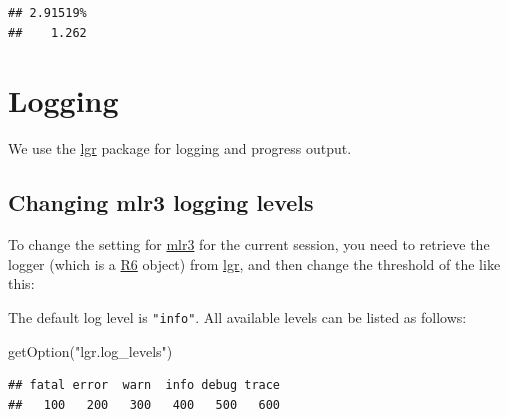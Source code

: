 \documentclass[
]{scrbook}
\newenvironment{Shaded}{\begin{snugshade}}{\end{snugshade}}
\newcommand{\FunctionTok}[1]{\textcolor[rgb]{0.00,0.00,0.00}{#1}}
\newcommand{\NormalTok}[1]{#1}
\newcommand{\OtherTok}[1]{\textcolor[rgb]{0.56,0.35,0.01}{#1}}
\newcommand{\SpecialCharTok}[1]{\textcolor[rgb]{0.00,0.00,0.00}{#1}}
\newcommand{\StringTok}[1]{\textcolor[rgb]{0.31,0.60,0.02}{#1}}
\renewenvironment{Shaded} {\begin{snugshade}\small} {\end{snugshade}}
\begin{document}
\begin{verbatim}
## 2.91519% 
##    1.262
\end{verbatim}

\hypertarget{logging}{%
\section{Logging}\label{logging}}

We use the \href{https://cran.r-project.org/package=lgr}{lgr} package for logging and progress output.

\hypertarget{changing-mlr3-logging-levels}{%
\subsection{Changing mlr3 logging levels}\label{changing-mlr3-logging-levels}}

To change the setting for \href{https://mlr3.mlr-org.com}{mlr3} for the current session, you need to retrieve the logger (which is a \href{https://cran.r-project.org/package=R6}{R6} object) from \href{https://cran.r-project.org/package=lgr}{lgr}, and then change the threshold of the like this:

\begin{Shaded}
\end{Shaded}

The default log level is \texttt{"info"}.
All available levels can be listed as follows:

\begin{Shaded}
\begin{Highlighting}[]
\FunctionTok{getOption}\NormalTok{(}\StringTok{"lgr.log\_levels"}\NormalTok{)}
\end{Highlighting}
\end{Shaded}

\begin{verbatim}
## fatal error  warn  info debug trace 
##   100   200   300   400   500   600
\end{verbatim}
\end{document}
